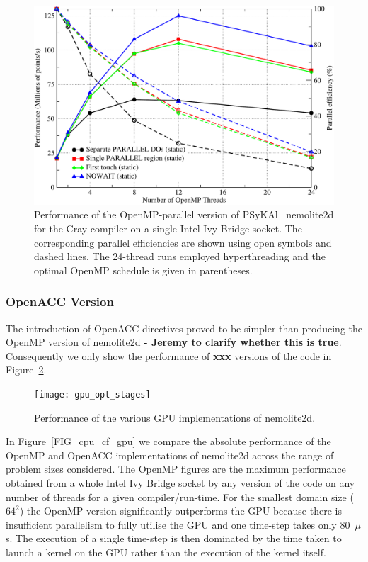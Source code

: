 \documentclass[journal]{IEEEtran}
\newlength{\picwidth}
\newcommand{\psykal}{{PS}y{KA}l\ }
\begin{document}
\begin{figure}
\centering
\includegraphics[width=\picwidth]{omp_scaling_32_cray}
\caption{Performance of the OpenMP-parallel version of \psykal
  nemolite2d for the Cray compiler on a single Intel Ivy Bridge
  socket.  The corresponding parallel efficiencies are shown using
  open symbols and dashed lines. The 24-thread runs employed
  hyperthreading and the optimal OpenMP schedule is given in
  parentheses.}
\label{FIG_cray_omp_32}
\end{figure}

\subsubsection{OpenACC Version}

The introduction of OpenACC directives proved to be simpler than
producing the OpenMP version of nemolite2d {\bf - Jeremy to clarify
  whether this is true}.  Consequently we only show the performance of
{\bf xxx} versions of the code in Figure~\ref{FIG_gpu_opt_stages}.

\begin{figure}
\centering
\texttt{[image: gpu\_opt\_stages]}
\caption{Performance of the various GPU implementations of nemolite2d.}
\label{FIG_gpu_opt_stages}
\end{figure}

In Figure~\ref{FIG_cpu_cf_gpu} we compare the absolute performance of
the OpenMP and OpenACC implementations of nemolite2d across the range
of problem sizes considered. The OpenMP figures are the maximum
performance obtained from a whole Intel Ivy Bridge socket by any
version of the code on any number of threads for a given
compiler/run-time. For the smallest domain size ($64^2$) the OpenMP
version significantly outperforms the GPU because there is
insufficient parallelism to fully utilise the GPU and one time-step
takes only 80~$\mu$s. The execution of a single time-step is then
dominated by the time taken to launch a kernel on the GPU rather than
the execution of the kernel itself.
\end{document}
